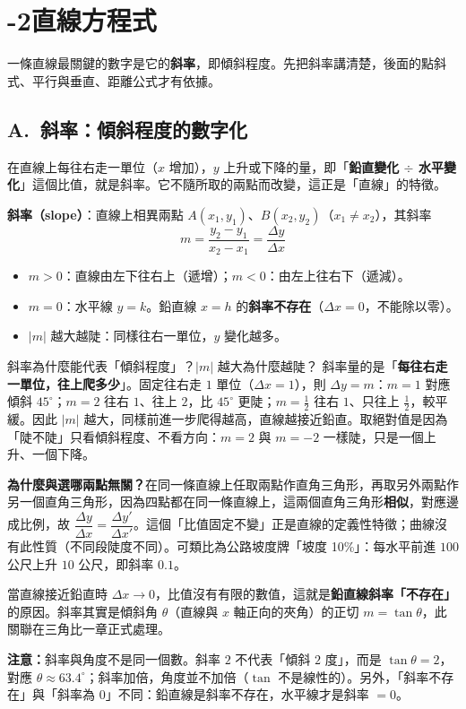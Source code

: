 \documentclass[11pt]{article}
\begin{document}
\section*{-2\quad 直線方程式}

一條直線最關鍵的數字是它的\textbf{斜率}，即傾斜程度。先把斜率講清楚，後面的點斜式、平行與垂直、距離公式才有依據。

\subsection*{\sffamily A.\ 斜率：傾斜程度的數字化}

在直線上每往右走一單位（$x$ 增加），$y$ 上升或下降的量，即「\textbf{鉛直變化 $\div$ 水平變化}」這個比值，就是斜率。它不隨所取的兩點而改變，這正是「直線」的特徵。

\textbf{斜率（slope）}：直線上相異兩點 $A(x_1,y_1)$、$B(x_2,y_2)$（$x_1\ne x_2$），其斜率
$$\boxed{\;m=\frac{y_2-y_1}{x_2-x_1}=\frac{\Delta y}{\Delta x}\;}$$
\begin{itemize}\setlength{\itemsep}{1pt}
\item $m>0$：直線由左下往右上（遞增）；$m<0$：由左上往右下（遞減）。
\item $m=0$：水平線 $y=k$。鉛直線 $x=h$ 的\textbf{斜率不存在}（$\Delta x=0$，不能除以零）。
\item $|m|$ 越大越陡：同樣往右一單位，$y$ 變化越多。
\end{itemize}

\begin{補充框}{斜率為什麼能代表「傾斜程度」？$|m|$ 越大為什麼越陡？}
斜率量的是「\textbf{每往右走一單位，往上爬多少}」。固定往右走 $1$ 單位（$\Delta x=1$），則 $\Delta y=m$：$m=1$ 對應傾斜 $45^\circ$；$m=2$ 往右 $1$、往上 $2$，比 $45^\circ$ 更陡；$m=\frac12$ 往右 $1$、只往上 $\frac12$，較平緩。因此 $|m|$ 越大，同樣前進一步爬得越高，直線越接近鉛直。取絕對值是因為「陡不陡」只看傾斜程度、不看方向：$m=2$ 與 $m=-2$ 一樣陡，只是一個上升、一個下降。

\textbf{為什麼與選哪兩點無關？}在同一條直線上任取兩點作直角三角形，再取另外兩點作另一個直角三角形，因為四點都在同一條直線上，這兩個直角三角形\textbf{相似}，對應邊成比例，故 $\dfrac{\Delta y}{\Delta x}=\dfrac{\Delta y'}{\Delta x'}$。這個「比值固定不變」正是直線的定義性特徵；曲線沒有此性質（不同段陡度不同）。可類比為公路坡度牌「坡度 10\%」：每水平前進 $100$ 公尺上升 $10$ 公尺，即斜率 $0.1$。

當直線接近鉛直時 $\Delta x\to0$，比值沒有有限的數值，這就是\textbf{鉛直線斜率「不存在」}的原因。斜率其實是傾斜角 $\theta$（直線與 $x$ 軸正向的夾角）的正切 $m=\tan\theta$，此關聯在三角比一章正式處理。

\textbf{注意：}斜率與角度不是同一個數。斜率 $2$ 不代表「傾斜 $2$ 度」，而是 $\tan\theta=2$，對應 $\theta\approx63.4^\circ$；斜率加倍，角度並不加倍（$\tan$ 不是線性的）。另外，「斜率不存在」與「斜率為 $0$」不同：鉛直線是斜率不存在，水平線才是斜率 $=0$。
\end{補充框}
\end{document}
